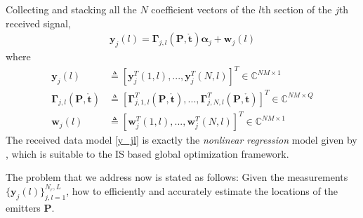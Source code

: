 \documentclass[review]{elsarticle}
\begin{document}
Collecting and stacking all the $N$ coefficient vectors of the $l$th section of the $j$th received signal,
\begin{align}\label{y_jl}
    \boldsymbol{y}_j(l)=\boldsymbol{\Gamma}_{j,l}(\boldsymbol{P},\mathring{\boldsymbol{t}})\boldsymbol{\alpha}_j+\boldsymbol{w}_j(l)
\end{align}
where
\begin{align}\label{Gammajl}
    \boldsymbol{y}_j(l)&\triangleq[\boldsymbol{y}_j^T(1,l),...,\boldsymbol{y}_j^T(N,l)]^T\in \mathbb{C}^{NM\times 1}\\ \nonumber
    \boldsymbol{\Gamma}_{j,l}(\boldsymbol{P},\mathring{\boldsymbol{t}})&\triangleq[\boldsymbol{\Gamma}_{j,1,l}^T(\boldsymbol{P},\mathring{\boldsymbol{t}}),...,\boldsymbol{\Gamma}_{j,N,l}^T(\boldsymbol{P},\mathring{\boldsymbol{t}})]^T\in \mathbb{C}^{NM\times Q}\\ 
    \boldsymbol{w}_j(l)&\triangleq[\boldsymbol{w}_j^T(1,l),...,\boldsymbol{w}_j^T(N,l)]^T\in \mathbb{C}^{NM\times 1}\nonumber
\end{align}
The received data model \eqref{y_jl} is exactly the \emph{nonlinear regression} model given by \cite{Kay2000Mean}, which is suitable to the IS based global optimization framework.

The problem that we address now is stated as follows: Given the measurements $\lbrace\boldsymbol{y}_j(l)\rbrace_{j,l=1}^{N_r,L}$, how to efficiently and accurately estimate the locations of the emitters $\boldsymbol{P}$.
\end{document}
